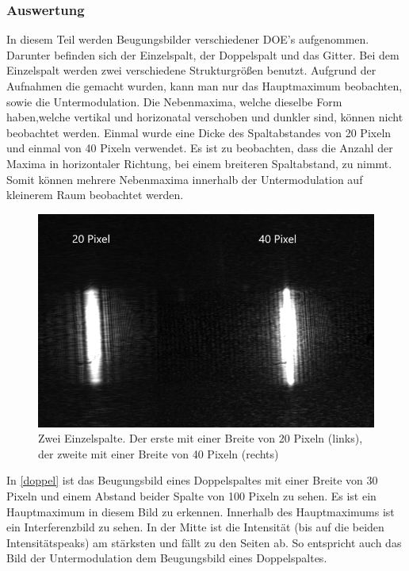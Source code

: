 \subsubsection{Auswertung}
In diesem Teil werden Beugungsbilder verschiedener DOE's aufgenommen. Darunter befinden sich der Einzelspalt, der Doppelspalt und das Gitter. Bei dem Einzelspalt werden zwei verschiedene Strukturgrößen benutzt. Aufgrund der Aufnahmen die gemacht wurden, kann man nur das Hauptmaximum beobachten, sowie die Untermodulation. Die Nebenmaxima, welche dieselbe Form haben,welche vertikal und horizonatal verschoben und dunkler sind, können nicht beobachtet werden. 
Einmal wurde eine Dicke des Spaltabstandes von 20 Pixeln und einmal von 40 Pixeln verwendet. Es ist zu beobachten, dass die Anzahl der Maxima in horizontaler Richtung, bei einem breiteren Spaltabstand, zu nimmt. Somit können mehrere Nebenmaxima innerhalb der Untermodulation auf kleinerem Raum beobachtet werden.
\begin{figure}[h!]
	\centering
	\includegraphics[scale = 1]{pixelverg.png}
	\caption{Zwei Einzelspalte. Der erste mit einer Breite von 20 Pixeln (links), der zweite mit einer Breite von 40 Pixeln (rechts)}
	\label{verg}
\end{figure}
In \cref{doppel} ist das Beugungsbild eines Doppelspaltes mit einer Breite von 30 Pixeln und einem Abstand beider Spalte von 100 Pixeln zu sehen. Es ist ein Hauptmaximum in diesem Bild zu erkennen. Innerhalb des Hauptmaximums ist ein Interferenzbild zu sehen. In der Mitte ist die Intensität (bis auf die beiden Intensitätspeaks) am stärksten und fällt zu den Seiten ab. So entspricht auch das Bild der Untermodulation dem Beugungsbild eines Doppelspaltes.
